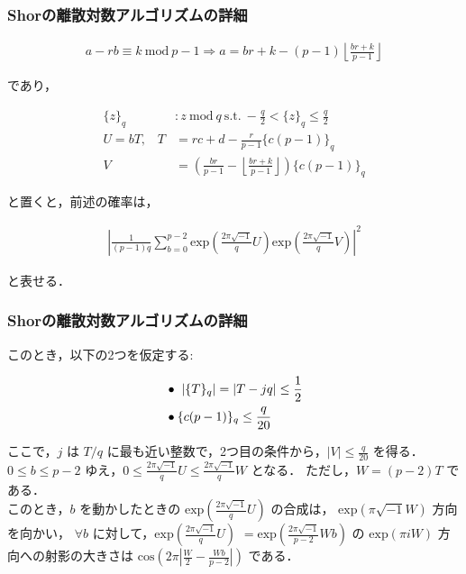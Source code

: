 \documentclass[dvipdfmx,12pt]{beamer}
\begin{document}
\begin{frame}

\frametitle{Shorの離散対数アルゴリズムの詳細}

\begin{align*}
    \displaystyle a - rb \equiv k \ \mathrm{mod} \ p - 1 \Rightarrow a = br + k - (p - 1) \left \lfloor \frac{br + k}{p - 1} \right \rfloor
\end{align*}

であり，\vspace{-15pt}

\begin{align*}
    \displaystyle \{ z \}_q & : z \ \mathrm{mod} \ q \ \mathrm{s.t.} \ - \frac{q}{2} < \{ z \}_q \leq \frac{q}{2} \\
    \displaystyle U = bT, \hspace{10pt} T & = rc + d - \frac{r}{p - 1} \{ c(p - 1)\}_q \\
    \displaystyle V & = \left( \frac{br}{p - 1} - \left \lfloor \frac{br + k}{p - 1} \right \rfloor \right) \{ c(p - 1) \}_q
\end{align*}

と置くと，前述の確率は， \vspace{-15pt}

\begin{align*}
    \left | \frac{1}{(p - 1) q} \sum_{b = 0}^{p - 2} \mathrm{exp} ( \frac{2 \pi \sqrt{-1}}{q} U ) \mathrm{exp} ( \frac{2 \pi \sqrt{-1}}{q} V ) \right |^2
\end{align*}

と表せる．

\end{frame}


\begin{frame}

\frametitle{Shorの離散対数アルゴリズムの詳細}
    
このとき，以下の2つを仮定する: \vspace{-15pt}

\begin{align*}
    \displaystyle & \bullet \ | \{ T \}_q | = | T - jq | \leq \frac{1}{2} \\
    \displaystyle & \bullet \{ c(p - 1) \}_q \leq \frac{q}{20}
\end{align*}

ここで，$j$ は $ T/q $ に最も近い整数で，2つ目の条件から，$ |V| \leq \frac{q}{20} $ を得る．
$ 0 \leq b \leq p - 2 $ ゆえ，$ 0 \leq \frac{2 \pi \sqrt{-1}}{q} U \leq \frac{2 \pi \sqrt{-1}}{q} W $ となる．
ただし，$ W = (p - 2) T $ である．\\
このとき，$b$ を動かしたときの $ \mathrm{exp} ( \frac{2 \pi \sqrt{-1}}{q} U ) $ の合成は，
$ \mathrm{exp} ( \pi \sqrt{-1} W ) $ 方向を向かい，
$ \forall b $ に対して，$ \displaystyle \mathrm{exp} \left( \frac{2 \pi \sqrt{-1}}{q} U \right) $  $ = \mathrm{exp} \left( \frac{2 \pi \sqrt{-1}}{p-2} Wb \right) $ の
$ \mathrm{exp}(\pi i W) $ 方向への射影の大きさは $ \displaystyle \mathrm{cos} \left( 2 \pi \left| \frac{W}{2} - \frac{Wb}{p - 2} \right| \right) $ である．

\end{frame}
\end{document}
